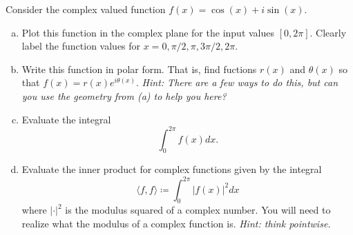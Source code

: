 \documentclass[12pt]{article} %
\newcommand{\innprod}[2]{\langle #1, #2\rangle}
\begin{document}
\newpage
\begin{problem}
	Consider the complex valued function $f(x) = \cos(x)+i\sin(x)$.  
	\begin{enumerate}[(a)]
		\item Plot this function in the complex plane for the input values $[0,2\pi]$. Clearly label the function values for $x=0,\pi/2,\pi,3\pi/2,2\pi$.
		\item Write this function in polar form. That is, find fuctions $r(x)$ and $\theta(x)$ so that $f(x)=r(x)e^{i\theta(x)}$. \emph{Hint: There are a few ways to do this, but can you use the geometry from (a) to help you here?}
		\item Evaluate the integral
		\[
			\int_0^{2\pi}f(x)dx.
		\]
		\item Evaluate the inner product for complex functions given by the integral
		\[
			\innprod{f}{f}\coloneqq \int_0^{2\pi} |f(x)|^2dx
		\]
		where $|\cdot|^2$ is the modulus squared of a complex number. You will need to realize what the modulus of a complex function is. \emph{Hint: think pointwise.}
	\end{enumerate}
\end{problem}
\end{document}
